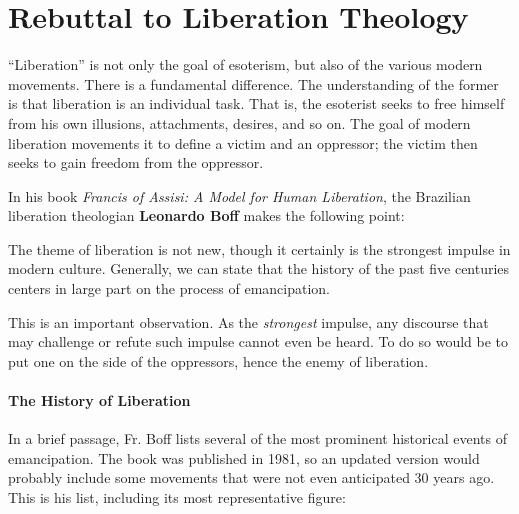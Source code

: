 \section{Rebuttal to Liberation Theology}

``Liberation'' is not only the goal of esoterism, but also of the various modern movements. There is a fundamental difference. The understanding of the former is that liberation is an individual task. That is, the esoterist seeks to free himself from his own illusions, attachments, desires, and so on. The goal of modern liberation movements it to define a victim and an oppressor; the victim then seeks to gain freedom from the oppressor.

In his book \textit{Francis of Assisi: A Model for Human Liberation}, the Brazilian liberation theologian \textbf{Leonardo Boff} makes the following point:

\begin{quotex}
The theme of liberation is not new, though it certainly is the strongest impulse in modern culture. Generally, we can state that the history of the past five centuries centers in large part on the process of emancipation.
\end{quotex}


This is an important observation. As the \emph{strongest} impulse, any discourse that may challenge or refute such impulse cannot even be heard. To do so would be to put one on the side of the oppressors, hence the enemy of liberation.

\paragraph{The History of Liberation}


In a brief passage, Fr. Boff lists several of the most prominent historical events of emancipation. The book was published in 1981, so an updated version would probably include some movements that were not even anticipated 30 years ago. This is his list, including its most representative figure:

